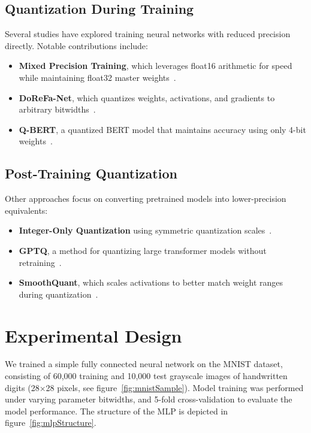 \documentclass[11pt]{article}
\begin{document}
\subsection*{Quantization During Training}
Several studies have explored training neural networks with reduced precision
directly. Notable contributions include:
\begin{itemize}
	\item \textbf{Mixed Precision Training}, which leverages float16 arithmetic for speed while maintaining float32 master weights~\cite{micikevicius2017mixed}.
	\item \textbf{DoReFa-Net}, which quantizes weights, activations, and gradients to arbitrary bitwidths~\cite{zhou2018dorefa}.
	\item \textbf{Q-BERT}, a quantized BERT model that maintains accuracy using only 4-bit weights~\cite{shen2020qbert}.
\end{itemize}

\subsection*{Post-Training Quantization}
Other approaches focus on converting pretrained models into lower-precision
equivalents:
\begin{itemize}
	\item \textbf{Integer-Only Quantization} using symmetric quantization scales~\cite{jacob2018quantization}.
	\item \textbf{GPTQ}, a method for quantizing large transformer models without retraining~\cite{frantar2022gptq}.
	\item \textbf{SmoothQuant}, which scales activations to better match weight ranges during quantization~\cite{xiao2024smoothquant}.
\end{itemize}

\section{Experimental Design}

We trained a simple fully connected neural network on the MNIST dataset,
consisting of 60,000 training and 10,000 test grayscale images of handwritten
digits (28×28 pixels, see figure~\ref{fig:mnistSample}). Model training was
performed under varying parameter bitwidths, and 5-fold cross-validation to
evaluate the model performance. The structure of the MLP is depicted in
figure~\ref{fig:mlpStructure}.
\end{document}
